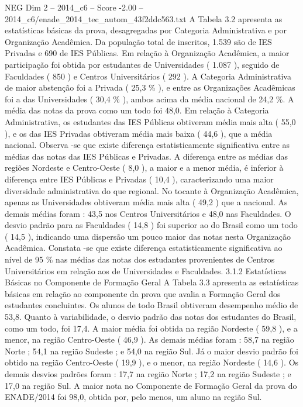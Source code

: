 \begin{textsample}{NEG Dim 2 – 2014\_c6 – Score -2.00 – 2014\_c6/enade\_2014\_tec\_autom\_43f2ddc563.txt}
A Tabela 3.2 apresenta as estatísticas básicas da prova, desagregadas por Categoria Administrativa e por Organização Acadêmica.
Da população total de inscritos, 1.539 são de IES Privadas e 690 de IES Públicas.
Em relação à Organização Acadêmica, a maior participação foi obtida por estudantes de Universidades ( 1.087 ), seguido de Faculdades ( 850 ) e Centros Universitários ( 292 ).
A Categoria Administrativa de maior abstenção foi a Privada ( 25,3 \% ), e entre as Organizações Acadêmicas foi a das Universidades ( 30,4 \% ), ambos acima da média nacional de 24,2 \%.
A média das notas da prova como um todo foi 48,0.
Em relação à Categoria Administrativa, os estudantes das IES Públicas obtiveram média mais alta ( 55,0 ), e os das IES Privadas obtiveram média mais baixa ( 44,6 ), que a média nacional.
Observa -se que existe diferença estatisticamente significativa entre as médias das notas das IES Públicas e Privadas.
A diferença entre as médias das regiões Nordeste e Centro-Oeste ( 8,0 ), a maior e a menor média, é inferior à diferença entre IES Públicas e Privadas ( 10,4 ), caracterizando uma maior diversidade administrativa do que regional.
No tocante à Organização Acadêmica, apenas as Universidades obtiveram média mais alta ( 49,2 ) que a nacional.
As demais médias foram : 43,5 nos Centros Universitários e 48,0 nas Faculdades.
O desvio padrão para as Faculdades ( 14,8 ) foi superior ao do Brasil como um todo ( 14,5 ), indicando uma dispersão um pouco maior das notas nesta Organização Acadêmica.
Constata -se que existe diferença estatisticamente significativa ao nível de 95 \% nas médias das notas dos estudantes provenientes de Centros Universitários em relação aos de Universidades e Faculdades. 3.1.2 Estatísticas Básicas no Componente de Formação Geral A Tabela 3.3 apresenta as estatísticas básicas em relação ao componente da prova que avalia a Formação Geral dos estudantes concluintes.
Os alunos de todo Brasil obtiveram desempenho médio de 53,8.
Quanto à variabilidade, o desvio padrão das notas dos estudantes do Brasil, como um todo, foi 17,4.
A maior média foi obtida na região Nordeste ( 59,8 ), e a menor, na região Centro-Oeste ( 46,9 ).
As demais médias foram : 58,7 na região Norte ; 54,1 na região Sudeste ; e 54,0 na região Sul.
Já o maior desvio padrão foi obtido na região Centro-Oeste ( 19,9 ), e o menor, na região Nordeste ( 14,6 ).
Os demais desvios padrões foram : 17,7 na região Norte ; 17,2 na região Sudeste ; e 17,0 na região Sul.
A maior nota no Componente de Formação Geral da prova do ENADE/2014 foi 98,0, obtida por, pelo menos, um aluno na região Sul.

\end{textsample}

